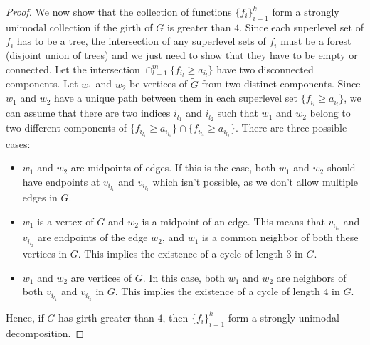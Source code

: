 \documentclass[11pt]{article}
\begin{document}
\begin{proof}
We now show that the collection of functions $\{ f_i\}_{i=1}^{k}$ form a strongly unimodal collection if the girth of $G$ is greater than $4$. Since each superlevel set of $f_i$ has to be a tree, the intersection of any superlevel sets of $f_i$ must be a forest (disjoint union of trees) and we just need to show that they have to be empty or connected. Let the intersection $\cap_{l=1}^{m} \{f_{i_l} \geq a_{i_l} \}$ have two disconnected components. Let $w_1$ and $w_2$ be vertices of $\tilde{G}$ from two distinct components. Since $w_1$ and $w_2$ have a unique path between them in each superlevel set $\{f_{i_l} \geq a_{i_l} \}$, we can assume that there are two indices $i_{l_1}$ and $i_{l_2}$ such that $w_1$ and $w_2$ belong to two different components of $\{f_{i_{l_1}} \geq a_{i_{l_1}} \} \cap \{f_{i_{l_2}} \geq a_{i_{l_2}} \}$. There are three possible cases:
\begin{itemize}
    \item $w_1$ and $w_2$ are midpoints of edges. If this is the case, both $w_1$ and $w_2$ should have endpoints at $v_{i_{l_1}}$ and $v_{i_{l_2}}$ which isn't possible, as we don't allow multiple edges in $G$.
    \item $w_1$ is a vertex of $G$ and $w_2$ is a midpoint of an edge. This means that $v_{i_{l_1}}$ and $v_{i_{l_2}}$ are endpoints of the edge $w_2$, and $w_1$ is a common neighbor of both these vertices in $G$. This implies the existence of a cycle of length $3$ in $G$.
    \item $w_1$ and $w_2$ are vertices of $G$. In this case, both $w_1$ and $w_2$ are neighbors of both $v_{i_{l_1}}$ and $v_{i_{l_2}}$ in $G$. This implies the existence of a cycle of length $4$ in $G$.
\end{itemize}
Hence, if $G$ has girth greater than $4$, then $\{f_i\}_{i=1}^{k}$ form a strongly unimodal decomposition.

\end{proof}
\end{document}
